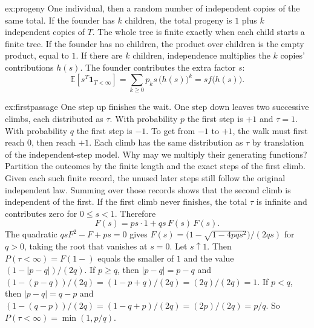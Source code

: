 \begin{solution}{ex:progeny}
\idea One individual, then a random number of independent copies of the same total.
\writeup If the founder has $k$ children, the total progeny is $1$ plus $k$ independent copies of $T$. The whole tree is finite exactly when each child starts a finite tree. If the founder has no children, the product over children is the empty product, equal to $1$. If there are $k$ children, independence multiplies the $k$ copies' contributions $h(s)$. The founder contributes the extra factor $s$:
\[
 \mathbb E[s^T\mathbf 1_{T<\infty}]=\sum_{k\ge0}p_k s\,\bigl(h(s)\bigr)^k=s f\bigl(h(s)\bigr).
\]
\end{solution}

\begin{solution}{ex:firstpassage}
\idea One step up finishes the wait. One step down leaves two successive climbs, each distributed as $\tau$.
\writeup With probability $p$ the first step is $+1$ and $\tau=1$. With probability $q$ the first step is $-1$. To get from $-1$ to $+1$, the walk must first reach $0$, then reach $+1$. Each climb has the same distribution as $\tau$ by translation of the independent-step model. Why may we multiply their generating functions? Partition the outcomes by the finite length and the exact steps of the first climb. Given each such finite record, the unused later steps still follow the original independent law. Summing over those records shows that the second climb is independent of the first. If the first climb never finishes, the total $\tau$ is infinite and contributes zero for $0\le s<1$. Therefore
\[
 F(s)=ps\cdot1+qs\,F(s)\,F(s).
\]
The quadratic $qs F^2-F+ps=0$ gives $F(s)=\bigl(1-\sqrt{1-4pqs^2}\bigr)/(2qs)$ for $q>0$, taking the root that vanishes at $s=0$. Let $s\uparrow1$. Then $P(\tau<\infty)=F(1-)$ equals the smaller of $1$ and the value $(1-|p-q|)/(2q)$. If $p\ge q$, then $|p-q|=p-q$ and $(1-(p-q))/(2q)=(1-p+q)/(2q)=(2q)/(2q)=1$. If $p<q$, then $|p-q|=q-p$ and $(1-(q-p))/(2q)=(1-q+p)/(2q)=(2p)/(2q)=p/q$. So $P(\tau<\infty)=\min(1,p/q)$.
\end{solution}

